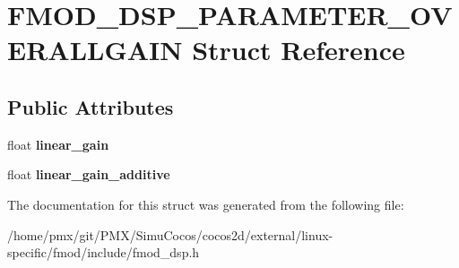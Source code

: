 \hypertarget{structFMOD__DSP__PARAMETER__OVERALLGAIN}{}\section{F\+M\+O\+D\+\_\+\+D\+S\+P\+\_\+\+P\+A\+R\+A\+M\+E\+T\+E\+R\+\_\+\+O\+V\+E\+R\+A\+L\+L\+G\+A\+IN Struct Reference}
\label{structFMOD__DSP__PARAMETER__OVERALLGAIN}
\subsection*{Public Attributes}
\begin{DoxyCompactItemize}
\item 
\mbox{\label{structFMOD__DSP__PARAMETER__OVERALLGAIN_a3d9f9459849cf076b0daba5a1486705e}} 
float {\bfseries linear\+\_\+gain}
\item 
\mbox{\label{structFMOD__DSP__PARAMETER__OVERALLGAIN_a634eb7a98720e0f9295243ac28031c7f}} 
float {\bfseries linear\+\_\+gain\+\_\+additive}
\end{DoxyCompactItemize}


The documentation for this struct was generated from the following file\+:\begin{DoxyCompactItemize}
\item 
/home/pmx/git/\+P\+M\+X/\+Simu\+Cocos/cocos2d/external/linux-\/specific/fmod/include/fmod\+\_\+dsp.\+h\end{DoxyCompactItemize}
